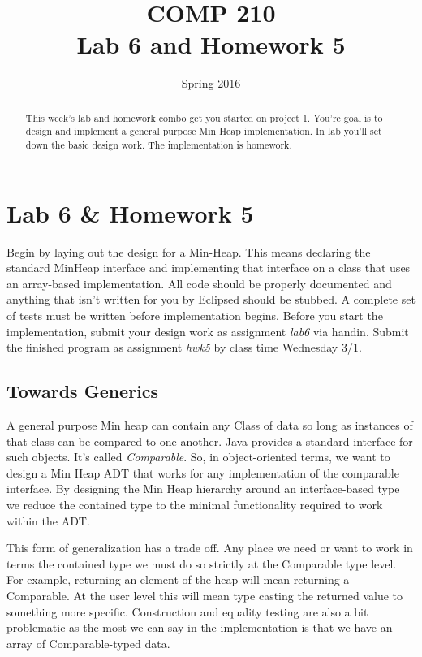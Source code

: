 \documentclass[nobib]{tufte-handout}
\title{COMP 210 \\ Lab 6 and Homework 5}
\date{Spring 2016}
\begin{document}
\maketitle

\begin{abstract}
This week's lab and homework combo get you started on project 1. You're goal is to design and implement a general purpose Min Heap implementation.  In lab you'll set down the basic design work. The implementation is homework.
\end{abstract}

\section{Lab 6 \& Homework 5}

Begin by laying out the design for a Min-Heap. This means declaring the standard MinHeap interface and implementing that interface on a class that uses an array-based implementation. All code should be properly documented and anything that isn't written for you by Eclipsed should be stubbed. A complete set of tests must be written before implementation begins. Before you start the implementation, submit your design work as assignment \textit{lab6} via handin. Submit the finished program as assignment \textit{hwk5} by class time Wednesday 3/1.

\subsection{ Towards Generics }

A general purpose Min heap can contain any Class of data so long as instances of that class can be compared to one another. Java provides a standard interface for such objects. It's called \textit{Comparable}.  So, in object-oriented terms, we want to design a Min Heap ADT that works for any implementation of the comparable interface. By designing the Min Heap hierarchy around an interface-based type we reduce the contained type to the minimal functionality required to work within the ADT\@.

This form of generalization has a trade off. Any place we need or want to work in terms the contained type we must do so strictly at the Comparable type level. For example, returning an element of the heap will mean returning a Comparable. At the user level this will mean type casting the returned value to something more specific. Construction and equality testing are also a bit problematic as the most we can say in the implementation is that we have an array of Comparable-typed data.
\end{document}
